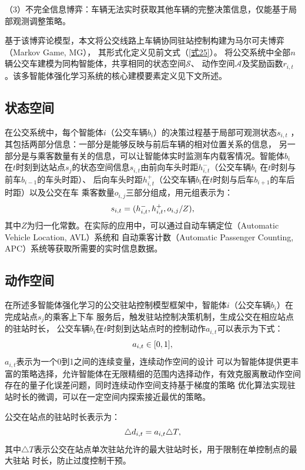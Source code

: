 （3）不完全信息博弈：车辆无法实时获取其他车辆的完整决策信息，仅能基于局部观测调整策略。

基于该博弈论模型，本文将公交线路上车辆协同驻站控制构建为马尔可夫博弈（Markov Game, MG），
其形式化定义见前文式（\ref{式25}）。
将公交系统中全部$n$辆公交车建模为同构智能体，共享相同的状态空间$\mathcal{S}$、
动作空间$\mathcal{A}$及奖励函数$r_{i,t}$。该多智能体强化学习系统的核心建模要素定义见下文所述。

\subsection{状态空间}
在公交系统中，每个智能体$i$（公交车辆$b_i$）的决策过程基于局部可观测状态$s_{i,t}$ ，其包括两部分信息：一部分是能够反映与前后车辆的相对位置关系的信息，
另一部分是与乘客数量有关的信息，可以让智能体实时监测车内载客情况。智能体$b_{i}$
在$t$时刻到达站点$s_{j}$的状态空间信息$s_{i,t}$由前向车头时距$h^-_{i,t}$（公交车辆$b_{i}$
在$t$时刻与前车$b_{i-1}$的车头时距）、
后向车头时距$h^+_{i,t}$（公交车辆$b_{i}$在$t$时刻与后车$b_{i+1}$的车后时距）以及公交在车
乘客数量$o_{i,j}$三部分组成，用元组表示为：
\begin{equation}\label{状态空间}
    \\s_{i,t} = (h^-_{i,t},h^+_{i,t},o_{i,j}/Z),
\end{equation}
其中$Z$为归一化常数。在实际的应用中，可以通过自动车辆定位（Automatic Vehicle Location, AVL）系统和
自动乘客计数（Automatic Passenger Counting, APC）系统等获取所需要的实时信息数据。

\subsection{动作空间}
在所述多智能体强化学习的公交驻站控制模型框架中，智能体$i$（公交车辆$b_i$）在完成站点$s_{j}$的乘客上下车
服务后，触发驻站控制决策机制，生成公交在相应站点的驻站时长，
公交车辆$b_{i}$在$t$时刻到达站点时的控制动作$a_{i,t}$可以表示为下式：
\begin{equation}\label{动作}
    \\a_{i,t} \in [0,1],
\end{equation}
$a_{i,t}$表示为一个0到1之间的连续变量，连续动作空间的设计
可以为智能体提供更丰富的策略选择，允许智能体在无限精细的范围内选择动作，有效克服离散动作空间
存在的量子化误差问题，同时连续动作空间支持基于梯度的策略
优化算法实现驻站时长的微调，可以在一定空间内探索接近最优的策略。

公交在站点的驻站时长表示为：
\begin{equation}\label{驻站时长}
    \\\triangle d_{i,t} = a_{i,t}\triangle T,
\end{equation}
其中$\triangle T$表示公交在站点单次驻站允许的最大驻站时长，用于限制在单控制点的最大驻站
时长，防止过度控制干预。

